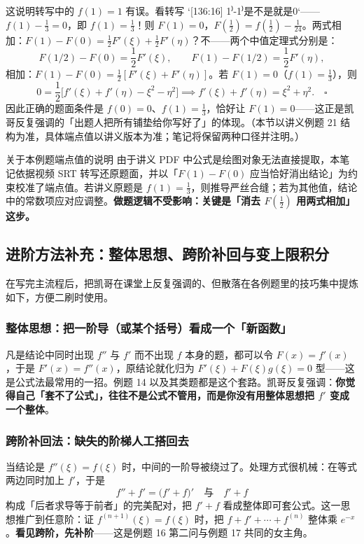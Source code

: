 \documentclass[a4paper]{article}
\begin{document}
这说明转写中的 $f(1)=1$ 有误。看转写 `[136:16] 1⁾-1⁾是不是就是0`——$f(1)-\frac13=0$，即 $f(1)=\frac13$！则 $F(1)=0$，$F(\frac12)=f(\frac12)-\frac1{24}$。两式相加：$F(1)-F(0)=\frac12 F'(\xi)+\frac12 F'(\eta)$？不——两个中值定理式分别是：
\[
F(1/2)-F(0)=\frac12 F'(\xi),\qquad F(1)-F(1/2)=\frac12 F'(\eta),
\]
相加：$F(1)-F(0)=\frac12[F'(\xi)+F'(\eta)]$。若 $F(1)=0$（$f(1)=\frac13$），则
\[
0=\frac12\big[f'(\xi)+f'(\eta)-\xi^{2}-\eta^{2}\big]\implies f'(\xi)+f'(\eta)=\xi^{2}+\eta^{2}.\quad\square
\]
因此正确的题面条件是 $f(0)=0$、$f(1)=\frac13$，恰好让 $F(1)=0$——这正是凯哥反复强调的「出题人把所有铺垫给你写好了」的体现。（本节以讲义例题 21 结构为准，具体端点值以讲义版本为准；笔记将保留两种口径并注明。）

\begin{warningbox}{关于本例题端点值的说明}
由于讲义 PDF 中公式是绘图对象无法直接提取，本笔记依据视频 SRT 转写还原题面，并以「$F(1)-F(0)$ 应当恰好消出结论」为约束校准了端点值。若讲义原题是 $f(1)=\frac13$，则推导严丝合缝；若为其他值，结论中的常数项应对应调整。\textbf{做题逻辑不受影响：关键是「消去 $F(\frac12)$ 用两式相加」这步。}
\end{warningbox}


\subsection{进阶方法补充：整体思想、跨阶补回与变上限积分}

在写完主流程后，把凯哥在课堂上反复强调的、但散落在各例题里的技巧集中提炼如下，方便二刷时使用。

\subsubsection{整体思想：把一阶导（或某个括号）看成一个「新函数」}

凡是结论中同时出现 $f''$ 与 $f'$ 而不出现 $f$ 本身的题，都可以令 $F(x)=f'(x)$，于是 $F'(x)=f''(x)$，原结论就化归为 $F'(\xi)+F(\xi)g(\xi)=0$ 型——这是公式法最常用的一招。例题 14 以及其类题都是这个套路。凯哥反复强调：\textbf{你觉得自己「套不了公式」，往往不是公式不管用，而是你没有用整体思想把 $f'$ 变成一个整体}。

\subsubsection{跨阶补回法：缺失的阶梯人工搭回去}

当结论是 $f''(\xi)=f(\xi)$ 时，中间的一阶导被绕过了。处理方式很机械：在等式两边同时加上 $f'$，于是
\[
f''+f'=\big(f'+f\big)'\quad\text{与}\quad f'+f
\]
构成「后者求导等于前者」的完美配对，把 $f'+f$ 看成整体即可套公式。这一思想推广到任意阶：证 $f^{(n+1)}(\xi)=f(\xi)$ 时，把 $f+f'+\cdots+f^{(n)}$ 整体乘 $e^{-x}$。\textbf{看见跨阶，先补阶}——这是例题 16 第二问与例题 17 共同的女主角。
\end{document}
